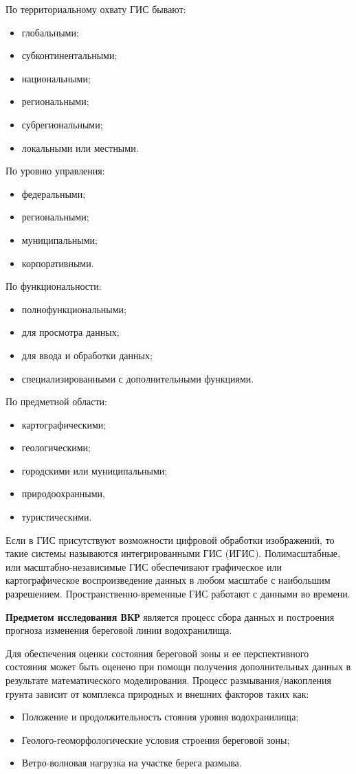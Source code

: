 \documentclass[732,14pt,final]{studrep}
\begin{document}
По территориальному охвату ГИС бывают:
\begin{itemize}
\item глобальными;
\item субконтинентальными;
\item национальными;
\item региональными;
\item субрегиональными;
\item локальными или местными.
\end{itemize}

По уровню управления:
\begin{itemize}
\item федеральными;
\item региональными;
\item муниципальными;
\item корпоративными.
\end{itemize}

По функциональности:
\begin{itemize}
\item полнофункциональными;
\item для просмотра данных;
\item для ввода и обработки данных;
\item специализированными с дополнительными функциями.
\end{itemize}

По предметной области:
\begin{itemize}
\item картографическими;
\item геологическими;
\item городскими или муниципальными;
\item природоохранными,
\item туристическими.
\end{itemize}

Если в ГИС присутствуют возможности цифровой обработки изображений, то такие системы называются интегрированными ГИС (ИГИС). Полимасштабные, или масштабно-независимые ГИС обеспечивают графическое или картографическое воспроизведение данных в любом масштабе с наибольшим разрешением. Пространственно-временные ГИС работают с данными во времени.

\textbf{Предметом исследования ВКР} является процесс сбора данных и построения прогноза изменения береговой линии водохранилища.

Для обеспечения оценки состояния береговой зоны и ее перспективного состояния может быть оценено при помощи получения дополнительных данных в результате математического моделирования. Процесс размывания/накопления грунта зависит от комплекса природных и внешних факторов таких как:
\begin{itemize}
\item Положение и продолжительность стояния уровня водохранилища;
\item Геолого-геоморфологические условия строения  береговой зоны;
\item Ветро-волновая нагрузка на участке берега размыва.
\end{itemize}
\end{document}
